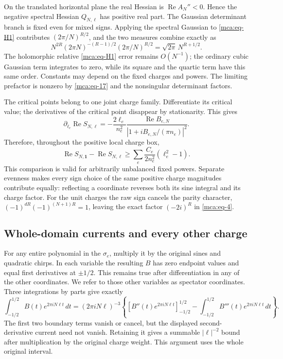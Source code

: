 On the translated horizontal plane the real Hessian is
\(\operatorname{Re}A_N''<0\). Hence the negative spectral Hessian
\(Q_{N,\ell}\) has positive real part. The Gaussian determinant branch
is fixed even for mixed signs. Applying the spectral Gaussian to
\eqref{mca:eq-H1} contributes \((2\pi/N)^{R/2}\), and the two measures
combine exactly as \begin{equation}\label{mca:eq-18}
N^{2R}(2\pi N)^{-(R-1)/2}(2\pi/N)^{R/2}
                     =\sqrt{2\pi}\,N^{R+1/2}.
\end{equation} The holomorphic relative \eqref{mca:eq-H1} error remains
\(O(N^{-1})\); the ordinary cubic Gaussian term integrates to zero,
while its square and the quartic term have this same order. Constants
may depend on the fixed charges and powers. The limiting prefactor is
nonzero by \eqref{mca:eq-17} and the nonsingular determinant factors.

The critical points belong to one joint charge family. Differentiate
its critical value; the derivatives of the critical point disappear
by stationarity. This gives \begin{equation}\label{mca:eq-19}
\partial_{\ell_e}\operatorname{Re}S_{N,\ell}
 =-\frac{2\ell_e}{n_e^2}
   \frac{\operatorname{Re}B_{e,N}}
        {|1+iB_{e,N}/(\pi n_e)|^2}.
\end{equation} Therefore, throughout the positive local charge box, \begin{equation}\label{mca:eq-20}
\operatorname{Re}S_{N,\mathbf1}-\operatorname{Re}S_{N,\ell}
       \ge\sum_e\frac{C_e}{2n_e^2}(\ell_e^2-1).
\end{equation} This comparison is valid for arbitrarily unbalanced fixed powers.
Separate evenness makes every sign choice of the same positive charge
magnitudes contribute equally: reflecting a coordinate reverses both its
sine integral and its charge factor. For the unit charges the raw sign
cancels the parity character, \((-1)^{dR}(-1)^{(N+1)R}=1\), leaving the
exact factor \((-2i)^R\) in \eqref{mca:eq-4}.

\subsection{Whole-domain currents and every other
charge}\label{mca:sec-7}

For any entire polynomial in the \(\sigma_e\), multiply it by the
original sines and quadratic chirps. In each variable the resulting
\(B\) has zero endpoint values and equal first derivatives at
\(\pm1/2\). This remains true after differentiation in any of the other
coordinates. We refer to those other variables as spectator coordinates. Three
integrations by parts give exactly \begin{equation}\label{mca:eq-21}
\int_{-1/2}^{1/2}B(t)e^{2\pi iN\ell t}\,dt
 =(2\pi iN\ell)^{-3}
 \left\{[B''(t)e^{2\pi iN\ell t}]_{-1/2}^{1/2}
       -\int_{-1/2}^{1/2}B'''(t)e^{2\pi iN\ell t}\,dt\right\}.
\end{equation} The first two boundary terms vanish or cancel, but the displayed
second-derivative current need not vanish. Retaining it gives a
summable \(|\ell|^{-2}\) bound after multiplication by the original
charge weight. This argument uses the whole original interval.

